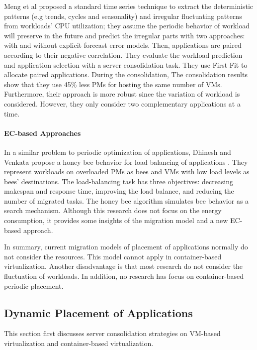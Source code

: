 Meng et al \cite{Meng:2010gh} proposed a standard time series technique to extract the deterministic patterns (e.g trends, cycles and seasonality) and irregular fluctuating patterns from workloads' CPU utilization; they assume the periodic behavior of workload will preserve in the future and predict the irregular parts with two approaches: with and without explicit forecast error models. Then, applications are paired according to their negative correlation. They evaluate the workload prediction and application selection with a server consolidation task. They use First Fit to allocate paired applications. During the consolidation, The consolidation results show that they use 45\% less PMs for hosting the same number of VMs. Furthermore, their approach is more robust since the variation of workload is considered. However, they only consider two complementary applications at a time. 

\paragraph{EC-based Approaches}
In a similar problem to periodic optimization of applications, Dhinesh and Venkata propose a honey bee behavior for load balancing  of applications \cite{Babu:2013jf}. They represent workloads on overloaded PMs as bees and VMs with low load levels as bees' destinations. The load-balancing task has three objectives: decreasing makespan and response time, improving the load balance, and reducing the number of migrated tasks. The honey bee algorithm simulates bee behavior as a search mechanism. Although this research does not focus on the energy consumption, it provides some insights of the migration model and a new EC-based approach.


\vspace{5mm}

In summary, current migration models of placement of applications normally do not consider the resources. This model cannot apply in container-based virtualization. Another disadvantage is that most research do not consider the fluctuation of workloads. In addition, no research has focus on container-based periodic placement. 



\subsection{Dynamic Placement of Applications}
This section first discusses server consolidation strategies on VM-based virtualization and container-based virtualization.

